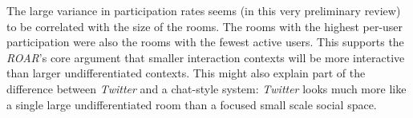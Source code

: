 The large variance in participation rates seems (in this very preliminary review) to be correlated with the size of the rooms. The rooms with the highest per-user participation were also the rooms with the fewest active users. This supports the \emph{ROAR}'s core argument that smaller interaction contexts will be more interactive than larger undifferentiated contexts. This might also explain part of the difference between \emph{Twitter} and a chat-style system: \emph{Twitter} looks much more like a single large undifferentiated room than a focused small scale social space.











